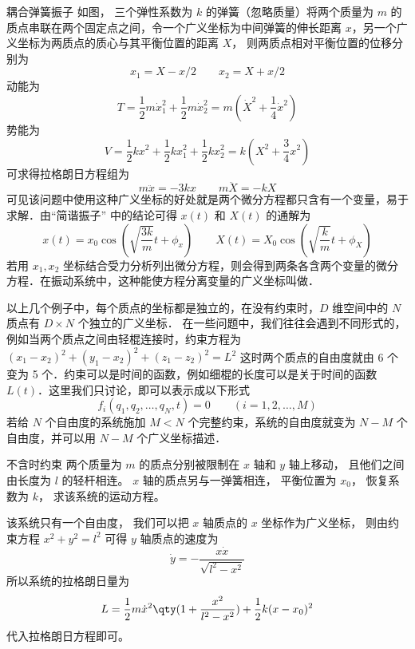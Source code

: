 \begin{exam}{耦合弹簧振子}
如图，%
三个弹性系数为 $k$ 的弹簧（忽略质量）将两个质量为 $m$ 的质点串联在两个固定点之间，令一个广义坐标为中间弹簧的伸长距离 $x$，另一个广义坐标为两质点的质心与其平衡位置的距离 $X$， 则两质点相对平衡位置的位移分别为
\begin{equation}
x_1=X-x/2 \qquad x_2 = X+x/2
\end{equation}
动能为
\begin{equation}
T=\frac{1}{2}m\dot x_1^2 + \frac{1}{2}m\dot x_2^2 = m\left( {{{\dot X}^2} + \frac{1}{4}{{\dot x}^2}} \right)
\end{equation}
势能为
\begin{equation}
V = \frac{1}{2}k{x^2} + \frac{1}{2}kx_1^2 + \frac{1}{2}kx_2^2 = k\left( X^2 + \frac 34 x^2 \right)
\end{equation}
可求得拉格朗日方程组为
\begin{equation}
m\ddot x =  - 3kx \qquad m\ddot X =  - kX
\end{equation}
可见该问题中使用这种广义坐标的好处就是两个微分方程都只含有一个变量，易于求解．由“简谐振子” 中的结论可得 $x(t)$ 和 $X(t)$ 的通解为
\begin{equation}
x(t) = {x_0}\cos \left( {\sqrt {\frac{{3k}}{m}} t + {\phi _x}} \right)
\qquad
X(t) = {X_0}\cos \left( {\sqrt {\frac{k}{m}} t + {\phi _X}} \right)
\end{equation}
若用 $x_1, x_2$ 坐标结合受力分析列出微分方程，则会得到两条各含两个变量的微分方程．在振动系统中，这种能使方程分离变量的广义坐标叫做．%
\end{exam}
\phantom{=}

以上几个例子中，每个质点的坐标都是独立的，在没有约束时，$D$ 维空间中的 $N$ 质点有 $D\times N$ 个独立的广义坐标． 在一些问题中，我们往往会遇到不同形式的，例如当两个质点之间由轻棍连接时，约束方程为 $(x_1-x_2)^2+(y_1-x_2)^2+(z_1-z_2)^2=L^2$ 这时两个质点的自由度就由 6 个变为 5 个．约束可以是时间的函数，例如细棍的长度可以是关于时间的函数 $L(t)$．这里我们只讨论，即可以表示成以下形式
\begin{equation}
f_i(q_1,q_2,\dots ,q_N,t) = 0 \qquad (i = 1,2,\dots,M)
\end{equation}
若给 $N$ 个自由度的系统施加 $M<N$ 个完整约束，系统的自由度就变为 $N-M$ 个自由度，并可以用 $N-M$ 个广义坐标描述．

\begin{exam}{不含时约束}
两个质量为 $m$ 的质点分别被限制在 $x$ 轴和 $y$ 轴上移动， 且他们之间由长度为 $l$ 的轻杆相连。 $x$ 轴的质点另与一弹簧相连， 平衡位置为 $x_0$， 恢复系数为 $k$， 求该系统的运动方程。

该系统只有一个自由度， 我们可以把 $x$ 轴质点的 $x$ 坐标作为广义坐标， 则由约束方程 $x^2 + y^2 = l^2$ 可得 $y$ 轴质点的速度为
\begin{equation}
\dot y = -\frac{x\dot x}{\sqrt{l^2 - x^2}}
\end{equation}
所以系统的拉格朗日量为
\begin{equation}
L = \frac 12 m \dot x^2\qty(1 + \frac{x^2}{l^2 - x^2}) + \frac 12 k (x-x_0)^2
\end{equation}
代入拉格朗日方程即可。
\end{exam}

